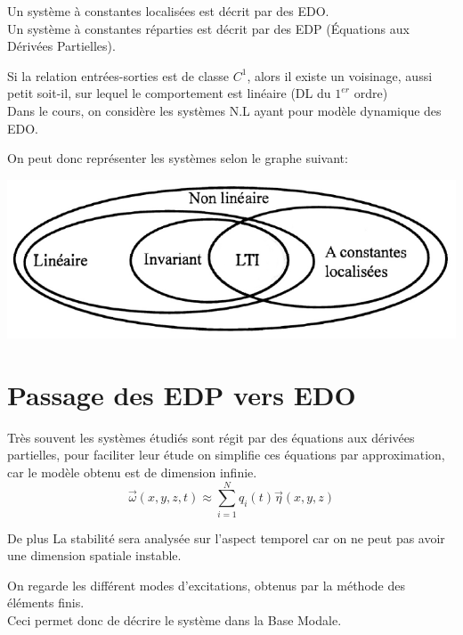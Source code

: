 \documentclass[main.tex]{subfiles}
\begin{document}
\begin{rem}
  Un système à constantes localisées est décrit par des EDO.\\
Un système à constantes réparties est décrit par des EDP (Équations aux Dérivées Partielles).\\
\end{rem}

\begin{rem}
  Si la relation entrées-sorties est de classe $C^1$, alors il existe un voisinage, aussi petit soit-il, sur lequel le comportement est linéaire (DL du $1^{er}$ ordre)\\
Dans le cours, on considère les systèmes N.L ayant pour modèle dynamique des EDO.
\end{rem}

On peut donc représenter les systèmes selon le graphe suivant:

\begin{center}
  \includegraphics[scale=0.35]{1/graph1.png}
\end{center}

\section{Passage des EDP vers EDO }

Très souvent les systèmes étudiés sont régit par des équations aux dérivées partielles, pour faciliter leur étude on simplifie ces équations par approximation, car le modèle obtenu est de dimension infinie.
\[\vec{\omega}(x,y,z,t) \approx \sum_{i=1}^Nq_i(t)\vec{\eta}(x,y,z)\]

De plus La stabilité sera analysée sur l'aspect temporel car on ne peut pas avoir une dimension spatiale instable.

\begin{example}
  On regarde les différent modes d'excitations, obtenus par la méthode des éléments finis.\\
Ceci permet donc de décrire le système dans la Base Modale.\\
\end{example}
\end{document}
